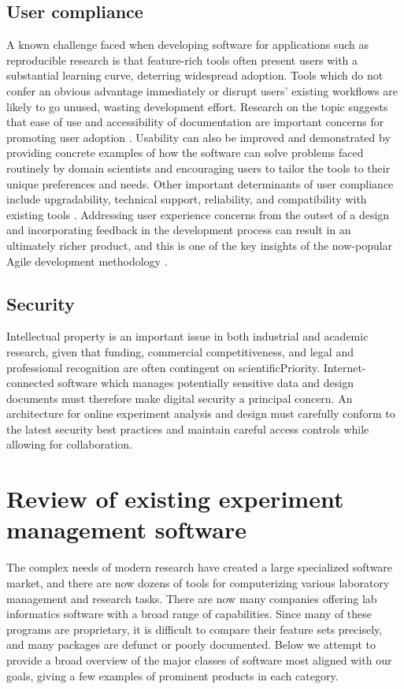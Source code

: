 \documentclass[../thesis]{subfiles}
\begin{document}
\subsection{User compliance}
A known challenge faced when developing software for applications such
as reproducible research is that feature-rich tools often present users
with a substantial learning curve, deterring widespread
adoption. Tools which do not confer an obvious
advantage immediately or disrupt users' existing workflows are likely
to go unused, wasting development effort. Research on the topic
suggests that ease of use and accessibility of documentation are
important concerns for promoting user adoption
\cite{Lederer2000}. Usability can also be improved and demonstrated by
providing concrete examples of how the software can solve problems
faced routinely by domain scientists and encouraging users to tailor
the tools to their unique preferences and needs. Other important
determinants of user compliance include upgradability, technical
support, reliability, and compatibility with existing tools
\cite{wang2001open}. Addressing user experience concerns from the
outset of a design and incorporating feedback in the development
process can result in an ultimately richer product, and this is one of
the key insights of the now-popular Agile development methodology
\cite{begel2007usage}.

\subsection{Security}
Intellectual property is an important issue in both industrial and
academic research, given that funding, commercial competitiveness, and
legal and professional recognition are often contingent on
\gls{scientificPriority}. Internet-connected software which manages
potentially sensitive data and design documents must therefore make
digital security a principal concern. An architecture for online
experiment analysis and design must carefully conform to the latest
security best practices and maintain careful access controls while
allowing for collaboration.

\section{Review of existing experiment management \mbox{software}}

The complex needs of modern research have created a large specialized
software market, and there are now dozens of tools for computerizing
various laboratory management and research tasks. There are now many
companies offering lab informatics software with a broad range of
capabilities. Since many of these programs are proprietary, it is
difficult to compare their feature sets precisely, and many
packages are defunct or poorly documented. Below we attempt to provide a
broad overview of the major classes of software most aligned with our
goals, giving a few examples of prominent products in each category.
\end{document}
